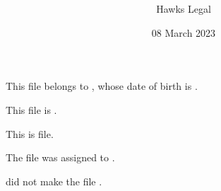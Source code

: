 \documentclass[12pt]{article}
\title{\large\bfseries\centering\MotionTitle}
\author{Hawks Legal}
\date{08 March 2023}
\begin{document}
\maketitle
\thispagestyle{fancy}

This file belongs to \clientname{}, whose date of birth is \clientdob{}. 

This file is \ThirdPossessive{}.

This is \ThirdPronomial{} file.

The file was assigned to \ThirdAccusative{}.

\ThirdNominative{} did not make the file \ThirdReflexive{}.
\end{document}

